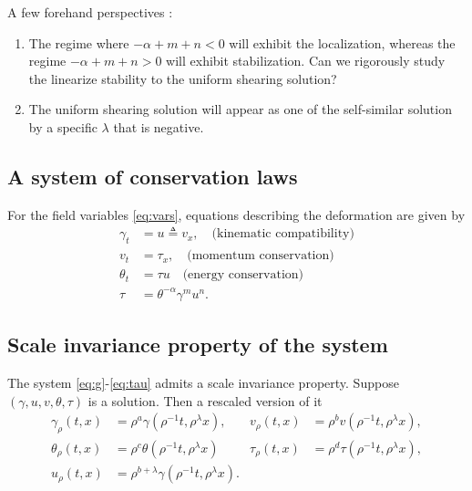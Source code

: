 \documentclass[a4paper,11pt]{article}
\def\blue{\color{blue}}
\begin{document}
A few forehand perspectives :
\begin{enumerate}
 \item The regime where $-\alpha+m+n <0$ will exhibit the localization, whereas the regime $-\alpha+m+n > 0$ will exhibit stabilization. {\blue Can we rigorously study the linearize stability to the uniform shearing solution?}
 \item The uniform shearing solution will appear as one of the self-similar solution by a specific $\lambda$ that is negative.
\end{enumerate}
\subsection{A system of conservation laws}
For the field variables \eqref{eq:vars}, equations describing the deformation are given by
\begin{align}
 \gamma_t &= u\triangleq v_x, \quad \text{(kinematic compatibility)} 	\label{eq:g}\\
 v_t &= \tau_x, \quad \text{(momentum conservation)} 	\label{eq:v}\\
 \theta_t &= \tau u \quad \text{(energy conservation)}	\label{eq:th}\\
 \tau &=\theta^{-\alpha}\gamma^m u^n.			\label{eq:tau}
\end{align}





\subsection{Scale invariance property of the system}
The system \eqref{eq:g}-\eqref{eq:tau} admits a scale invariance property. Suppose $(\gamma,u,v,\theta,\tau)$ is a solution. Then a rescaled version of it
\begin{align*}
 \gamma_\rho(t,x) &= \rho^a\gamma(\rho^{-1}t,\rho^\lambda x), &
 v_\rho(t,x) &= \rho^bv(\rho^{-1}t,\rho^\lambda x),\\
 \theta_\rho(t,x) &= \rho^c\theta(\rho^{-1}t,\rho^\lambda x) &
 \tau_\rho(t,x) &= \rho^d\tau(\rho^{-1}t,\rho^\lambda x),\\
 u_\rho(t,x) &= \rho^{b+\lambda}\gamma(\rho^{-1}t,\rho^\lambda x).
\end{align*}
\end{document}
